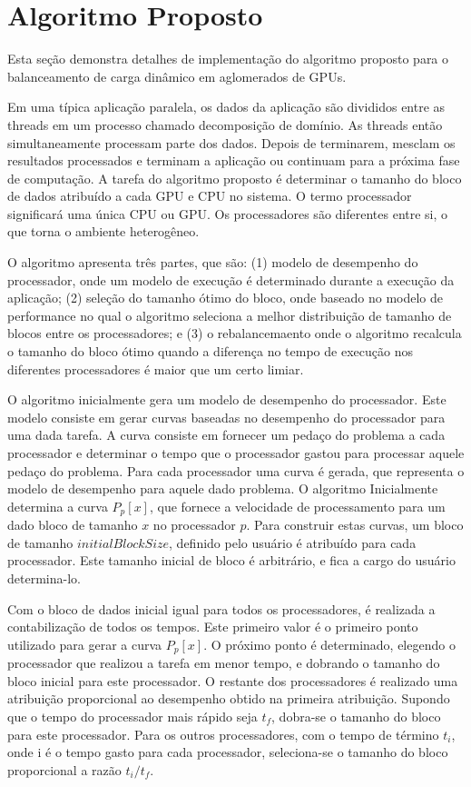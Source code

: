 \pagestyle{empty}
\cleardoublepage
\pagestyle{fancy}

\onehalfspacing

\chapter{Algoritmo Proposto}\label{cap4}

Esta seção demonstra detalhes de implementação do algoritmo proposto para o balanceamento de carga dinâmico em aglomerados de GPUs. 

Em uma típica aplicação paralela, os dados da aplicação são divididos entre as threads em um processo chamado decomposição de domínio. As threads então simultaneamente processam parte dos dados. Depois de terminarem, mesclam os resultados processados e terminam a aplicação ou continuam para a próxima fase de computação. A tarefa do algoritmo proposto é determinar o tamanho do bloco de dados atribuído a cada GPU e CPU no sistema. O termo processador significará uma única CPU ou GPU. Os processadores são diferentes entre si, o que torna o ambiente heterogêneo. 

O algoritmo apresenta três partes, que são: (1) modelo de desempenho do processador, onde um modelo de execução é determinado durante a execução da aplicação; (2) seleção do tamanho ótimo do bloco, onde baseado no modelo de performance no qual o algoritmo seleciona a melhor distribuição de tamanho de blocos entre os processadores; e (3) o rebalancemaento onde o algoritmo recalcula o tamanho do bloco ótimo quando a diferença no tempo de execução nos diferentes processadores é maior que um certo limiar.

O algoritmo inicialmente gera um modelo de desempenho do processador. Este modelo consiste em gerar curvas baseadas no desempenho do processador para uma dada tarefa. A curva consiste em fornecer um pedaço do problema a cada processador e determinar o tempo que o processador gastou para processar aquele pedaço do problema. Para cada processador uma curva é gerada, que representa o modelo de desempenho para aquele dado problema. O algoritmo Inicialmente determina a curva $P_p[x]$, que fornece a velocidade de processamento para um dado bloco de tamanho $x$ no processador $p$. Para construir estas curvas, um bloco de tamanho $initialBlockSize$, definido pelo usuário é atribuído para cada processador. Este tamanho inicial de bloco é arbitrário, e fica a cargo do usuário determina-lo.

Com o bloco de dados inicial igual para todos os processadores, é realizada a contabilização de todos os tempos. Este primeiro valor é o primeiro ponto utilizado para gerar a curva $P_p[x]$. O próximo ponto é determinado, elegendo o processador que realizou a tarefa em menor tempo, e dobrando o tamanho do bloco inicial para este processador. O restante dos processadores é realizado uma atribuição proporcional ao desempenho obtido na primeira atribuição. Supondo que o tempo do processador mais rápido seja $t_f$, dobra-se o tamanho do bloco para este processador. Para os outros processadores, com o tempo de término $t_i$, onde i é o tempo gasto para cada processador, seleciona-se o tamanho do bloco proporcional a razão $t_i/t_f$. 


